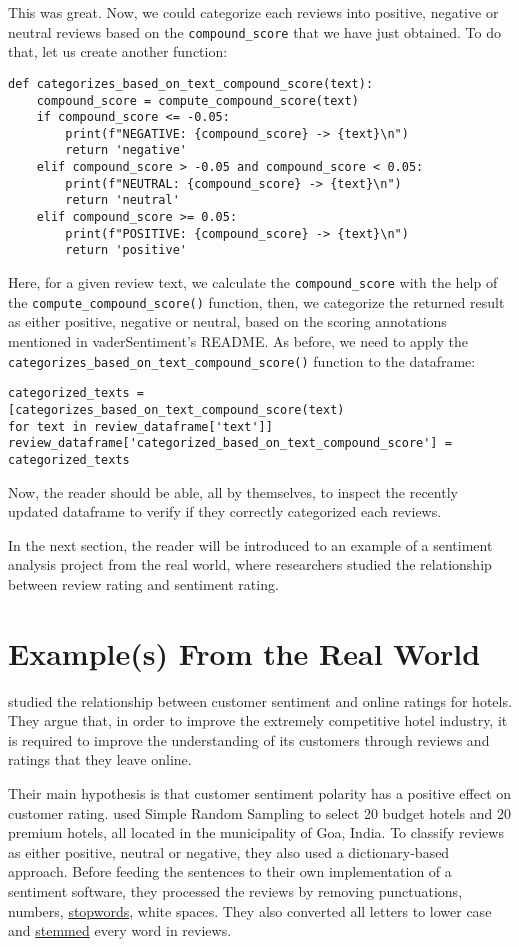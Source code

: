 	This was great. Now, we could categorize each reviews into positive, negative or neutral reviews based on the \verb|compound_score| that we have just obtained. To do that, let us create another function:
	\begin{Verbatim}
def categorizes_based_on_text_compound_score(text):
	compound_score = compute_compound_score(text)
	if compound_score <= -0.05:
		print(f"NEGATIVE: {compound_score} -> {text}\n")
		return 'negative'
	elif compound_score > -0.05 and compound_score < 0.05:
		print(f"NEUTRAL: {compound_score} -> {text}\n")
		return 'neutral'
	elif compound_score >= 0.05:
		print(f"POSITIVE: {compound_score} -> {text}\n")
		return 'positive'
	\end{Verbatim}
	Here, for a given review text, we calculate the \verb|compound_score| with the help of the \verb|compute_compound_score()| function, then, we categorize the returned result as either positive, negative or neutral, based on the scoring annotations mentioned in vaderSentiment's README. As before, we need to apply the \verb|categorizes_based_on_text_compound_score()| function to the dataframe:
	\begin{Verbatim}
categorized_texts =
[categorizes_based_on_text_compound_score(text)
for text in review_dataframe['text']]
review_dataframe['categorized_based_on_text_compound_score'] =
categorized_texts
	\end{Verbatim}
	Now, the reader should be able, all by themselves, to inspect the recently updated dataframe to verify if they correctly categorized each reviews.

	In the next section, the reader will be introduced to an example of a sentiment analysis project from the real world, where researchers studied the relationship between review rating and sentiment rating.

	\section{Example(s) From the Real World}\label{sec:examplerealworld}
	\cite{geetha_relationship_2017} studied the relationship between customer sentiment and online ratings for hotels. They argue that, in order to improve the extremely competitive hotel industry, it is required to improve the understanding of its customers through reviews and ratings that they leave online.

	Their main hypothesis is that customer sentiment polarity has a positive effect on customer rating. \cite{geetha_relationship_2017} used Simple Random Sampling to select 20 budget hotels and 20 premium hotels, all located in the municipality of Goa, India. To classify reviews as either positive, neutral or negative, they also used a dictionary-based approach. Before feeding the sentences to their own implementation of a sentiment software, they processed the reviews by removing punctuations, numbers, \href{https://en.wikipedia.org/wiki/Stop_words}{stopwords}, white spaces. They also converted all letters to lower case and \href{https://en.wikipedia.org/wiki/Stemming}{stemmed} every word in reviews.

